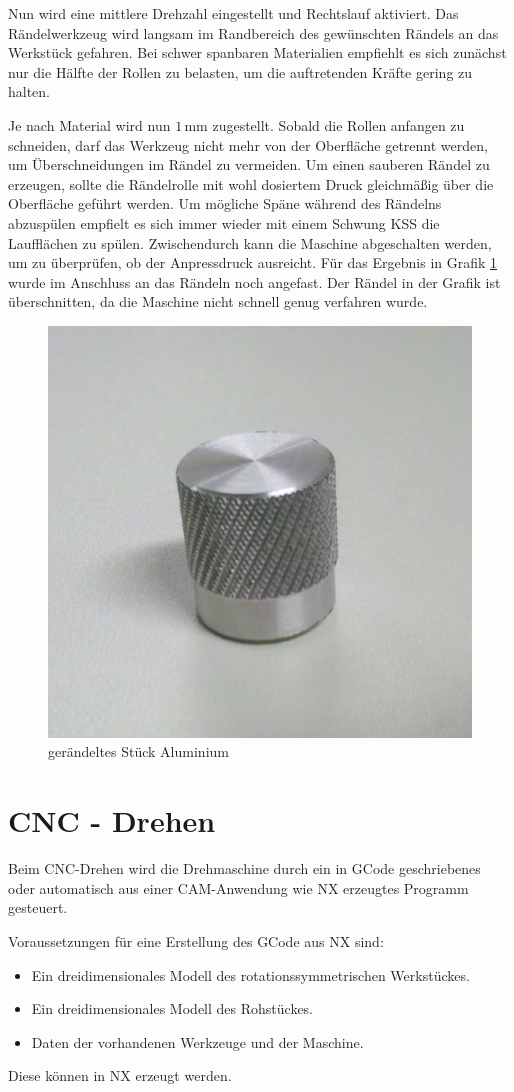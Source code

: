 \documentclass{\basedir/fablab-document}
\begin{document}
Nun wird eine mittlere Drehzahl eingestellt und Rechtslauf aktiviert. 
Das Rändelwerkzeug wird langsam im Randbereich des gewünschten Rändels an das Werkstück gefahren. 
Bei schwer spanbaren Materialien empfiehlt es sich zunächst nur die Hälfte der Rollen zu belasten, um die auftretenden Kräfte gering zu halten.

Je nach Material wird nun $1$\,mm zugestellt. Sobald die Rollen anfangen zu schneiden, darf das Werkzeug nicht mehr von der Oberfläche getrennt werden, um Überschneidungen im Rändel zu vermeiden.
Um einen sauberen Rändel zu erzeugen, sollte die Rändelrolle mit wohl dosiertem Druck gleichmäßig über die Oberfläche geführt werden.
Um mögliche Späne während des Rändelns abzuspülen empfielt es sich immer wieder mit einem Schwung KSS die Laufflächen zu spülen.
Zwischendurch kann die Maschine abgeschalten werden, um zu überprüfen, ob der Anpressdruck ausreicht.
Für das Ergebnis in Grafik \ref{fig:raendel} wurde im Anschluss an das Rändeln noch angefast.
Der Rändel in der Grafik ist überschnitten, da die Maschine nicht schnell genug verfahren wurde.

\begin{figure}[hb]
\caption{gerändeltes Stück Aluminium}
\label{fig:raendel}
\centering
\includegraphics[width=.5\linewidth]{img/raendel}
\end{figure}
\newpage
\section{CNC - Drehen}

Beim CNC-Drehen wird die Drehmaschine durch ein in GCode geschriebenes oder automatisch aus einer CAM-Anwendung wie NX erzeugtes Programm gesteuert.

Voraussetzungen für eine Erstellung des GCode aus NX sind:
\begin{itemize}
	\item Ein dreidimensionales Modell des rotationssymmetrischen Werkstückes.
	\item Ein dreidimensionales Modell des Rohstückes.
	\item Daten der vorhandenen Werkzeuge und der Maschine.
\end{itemize}
Diese können in NX erzeugt werden.
\end{document}
